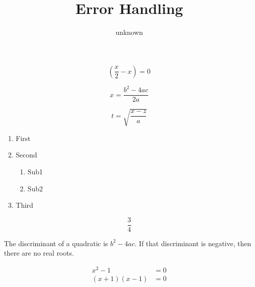 \documentclass{article}
\title{Error Handling}
\author{unknown}
\begin{document}
\maketitle


$$\left( \frac{x}{2} - x \right) = 0$$


$$ x = \frac{b^2-4ac}{2a}$$


$$t = \sqrt{\frac{x-z}{a}}$$


\begin{enumerate}
\item First
\item Second
		\begin{enumerate}
		\item Sub1
		\item Sub2
		\end{enumerate} %
\item Third
\end{enumerate}



$$\frac{3}{4}$$



The discriminant of a quadratic is $b^2 - 4ac$.  If that discriminant
is negative, then there are no real roots.




\begin{align*}
	x^2 - 1 &= 0 \\
	(x+1)(x-1) &= 0
\end{align*}
\end{document}
